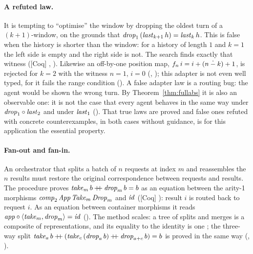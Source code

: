 \documentclass{fundam}
\begin{document}
\paragraph{A refuted law.}  It is tempting to ``optimise'' the window by dropping the
oldest turn of a $(k+1)$-window, on the grounds that
$\mathit{drop}_1\,(\mathit{last}_{k+1}\,h) = \mathit{last}_k\,h$.  This is false when the history is shorter
than the window: for a history of length $1$ and $k = 1$ the left side is empty and the
right side is not.  The search finds exactly that witness (\textsf{[Coq]}
, ).  Likewise an off-by-one position
map, $f_n\,i = i + (n \mathbin{\dot{-}} k) + 1$, is rejected for $k = 2$ with the witness $n = 1$,
$i = 0$ (, ); this adapter is not even well
typed, for it fails the range condition ().  A false adapter
law is a routing bug: the agent would be shown the wrong turn.  By
Theorem~\ref{thm:fullabs} it is also an observable one: it is not the case that every
agent behaves in the same way under $\mathit{drop}_1 \circ \mathit{last}_2$ and under
$\mathit{last}_1$ ().  That true laws are proved and false ones
refuted with concrete counterexamples, in both cases without guidance, is for this
application the essential property.

\paragraph{Fan-out and fan-in.}  An orchestrator that splits a batch of $n$ requests at
index $m$ and reassembles the $n$ results must restore the original correspondence between
requests and results.  The procedure proves
$\mathit{take}_m\,b \mathbin{+\!\!+} \mathit{drop}_m\,b = b$ as an equation between the arity-1 morphisms
$\mathit{comp}_2\,\mathit{App}\,\mathit{Take}_m\,\mathit{Drop}_m$ and $\mathit{id}$
(\textsf{[Coq]} ): result $i$ is routed back to request $i$.  As an
equation between container morphisms it reads
$\mathit{app} \circ \langle \mathit{take}_m, \mathit{drop}_m \rangle = \mathit{id}$
().  The method scales: a tree of splits and merges is a
composite of representations, and its equality to the identity is one ; the
three-way split
$\mathit{take}_a\,b \mathbin{+\!\!+} (\mathit{take}_c\,(\mathit{drop}_a\,b) \mathbin{+\!\!+} \mathit{drop}_{a+c}\,b) = b$ is
proved in the same way (, ).
\end{document}
